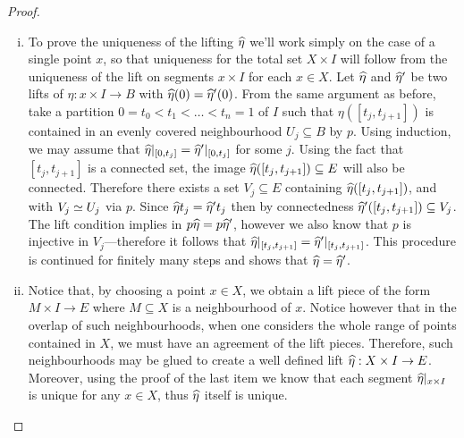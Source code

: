 \begin{proof}
\begin{enumerate}[(i)]
        \item To prove the uniqueness of the lifting \(\widehat\eta\) we'll work simply on
              the case of a single point \(x\), so that uniqueness for the total set
              \(X \times I\) will follow from the uniqueness of the lift on segments
              \(x \times I\) for each \(x \in X\). Let \(\widehat\eta\) and \(\widehat\eta'\) be
              two lifts of \(\eta: x \times I \to B\) with \(\widehat\eta(0) =
              \widehat\eta'(0)\). From the same argument as before, take a partition
              \(0 = t_0 < t_1 < \dots < t_n = 1\) of \(I\) such that
              \(\eta([t_j, t_{j+1}])\) is contained in an evenly covered neighbourhood
              \(U_j \subseteq B\) by \(p\). Using induction, we may assume that
              \(\widehat\eta|_{[0, t_j]} = \widehat\eta'|_{[0, t_j]}\) for some \(j\). Using the
              fact that \([t_j, t_{j+1}]\) is a connected set, the image
              \(\widehat\eta([t_j, t_{j+1}]) \subseteq E\) will also be connected. Therefore
              there exists a set \(V_j \subseteq E\) containing
              \(\widehat\eta([t_j, t_{j+1}])\), and with \(V_j \simeq U_j\) via \(p\). Since
              \(\widehat\eta t_j = \widehat\eta' t_j\) then by connectedness
              \(\widehat\eta'([t_j, t_{j+1}]) \subseteq V_j\). The lift condition implies in
              \(p \widehat\eta = p \widehat\eta'\), however we also know that \(p\) is injective
              in \(V_j\)---therefore it follows that
              \(\widehat\eta|_{[t_j, t_{j+1}]} = \widehat\eta'|_{[t_j, t_{j+1}]}\). This procedure
              is continued for finitely many steps and shows that
              \(\widehat\eta = \widehat\eta'\).

        \item Notice that, by choosing a point \(x \in X\), we obtain a lift piece of
              the form \(M \times I \to E\) where \(M \subseteq X\) is a neighbourhood of
              \(x\). Notice however that in the overlap of such neighbourhoods, when one
              considers the whole range of points contained in \(X\), we must have an
              agreement of the lift pieces. Therefore, such neighbourhoods may be glued to
              create a well defined lift \(\widehat\eta: X \times I \to E\). Moreover, using
              the proof of the last item we know that each segment
              \(\widehat\eta|_{x \times I}\) is unique for any \(x \in X\), thus \(\widehat\eta\)
              itself is unique.
    \end{enumerate}
\end{proof}

